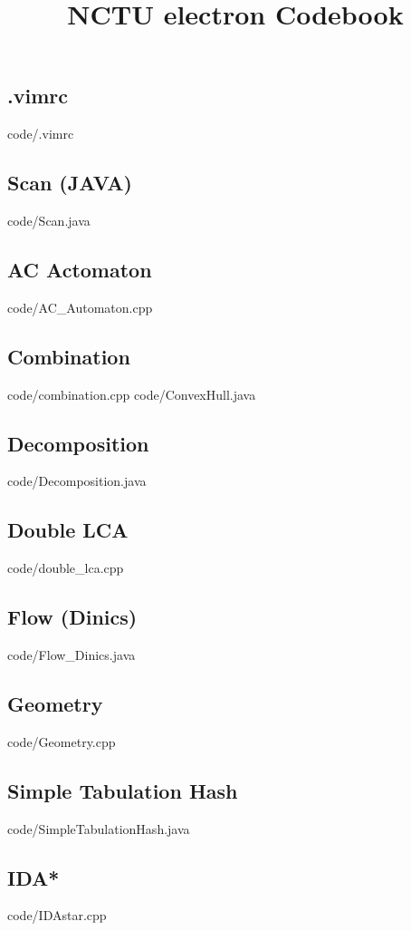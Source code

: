 \documentclass [landscape,10pt,a4paper,twocolumn,nofonts]{article}
\title {NCTU electron Codebook}
\begin{document}
\thispagestyle{fancy}
\tableofcontents
\newpage
\subsection{.vimrc}
 {code/.vimrc}
\subsection{Scan (JAVA)}
 {code/Scan.java}
\subsection{AC Actomaton}
 {code/AC_Automaton.cpp}
\subsection{Combination}
 {code/combination.cpp}
 {code/ConvexHull.java}
\subsection{Decomposition}
 {code/Decomposition.java}
\subsection{Double LCA}
 {code/double_lca.cpp}
\subsection{Flow (Dinics)}
 {code/Flow_Dinics.java}
\subsection{Geometry}
 {code/Geometry.cpp}
\subsection{Simple Tabulation Hash}
 {code/SimpleTabulationHash.java}
\subsection{IDA*}
 {code/IDAstar.cpp}
\end{document}
